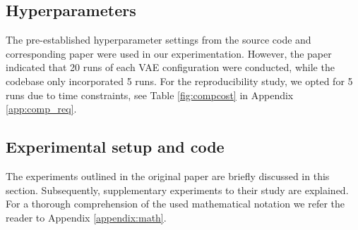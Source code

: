 \subsection{Hyperparameters}

The pre-established hyperparameter settings from the source code and corresponding paper were used in our experimentation. However, the paper indicated that 20 runs of each VAE configuration were conducted, while the codebase only incorporated 5 runs. For the reproducibility study, we opted for 5 runs due to time constraints, see Table \ref{fig:compcost} in Appendix \ref{app:comp_req}. %

\subsection{Experimental setup and code}
\label{experimentalsetup}

The experiments outlined in the original paper are briefly discussed in this section. Subsequently, supplementary experiments to their study are explained. For a thorough comprehension of the used mathematical notation we refer the reader to Appendix \ref{appendix:math}.

